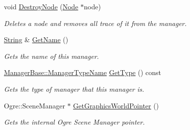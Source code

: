 \begin{DoxyCompactItemize}
void \hyperlink{classphys_1_1SceneManager_a4c26ed31f84b171101db2b5ef184d701}{DestroyNode} (\hyperlink{classphys_1_1Node}{Node} $\ast$node)
\begin{DoxyCompactList}\small\item\em Deletes a node and removes all trace of it from the manager. \item\end{DoxyCompactList}\item 
\hyperlink{namespacephys_aa03900411993de7fbfec4789bc1d392e}{String} \& \hyperlink{classphys_1_1SceneManager_ab06d592af9c696d835f216963038dbc2}{GetName} ()
\begin{DoxyCompactList}\small\item\em Gets the name of this manager. \item\end{DoxyCompactList}\item 
\hyperlink{classphys_1_1ManagerBase_aaa6ccddf23892eaccb898529414f80a5}{ManagerBase::ManagerTypeName} \hyperlink{classphys_1_1SceneManager_af2b4f6bc50d40ffe06f6172c3d1dd02d}{GetType} () const 
\begin{DoxyCompactList}\small\item\em Gets the type of manager that this manager is. \item\end{DoxyCompactList}\item 
Ogre::SceneManager $\ast$ \hyperlink{classphys_1_1SceneManager_af3e5081f780b6527f075d1bb579f0601}{GetGraphicsWorldPointer} ()
\begin{DoxyCompactList}\small\item\em Gets the internal Ogre Scene Manager pointer. \item\end{DoxyCompactList}\end{DoxyCompactItemize}

